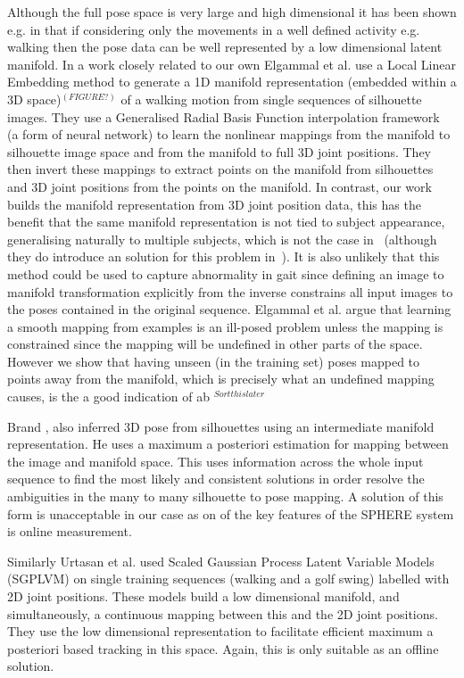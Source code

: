 \documentclass[11pt]{article} %
\begin{document}
Although the full pose space is very large and high dimensional it has been shown e.g. in \cite{Brand1999,Elgammal2004} that if considering only the movements in a well defined activity e.g. walking then the pose data can be well represented by a low dimensional latent manifold.  In a work closely related to our own Elgammal et al. \cite{Elgammal2004} use a Local Linear Embedding method to generate a 1D manifold representation (embedded within a 3D space)$^{(FIGURE?)}$ of a walking motion from single sequences of silhouette images. They use a Generalised Radial Basis Function interpolation framework~\cite{Poggio1990} (a form of neural network) to learn the nonlinear mappings from the manifold to silhouette image space and from the manifold to full 3D joint positions. They then invert these mappings to extract points on the manifold from silhouettes and 3D joint positions from the points on the manifold. In contrast, our work builds the manifold representation from 3D joint position data, this has the benefit that the same manifold representation is not tied to subject appearance, generalising naturally to multiple subjects, which is not the case in~\cite{Elgammal2004} (although they do introduce an solution for this problem in~\cite{Elgammal2004b}). It is also unlikely that this method could be used to capture abnormality in gait since defining an image to manifold transformation explicitly from the inverse constrains all input images to the poses contained in the original sequence.  Elgammal et al. argue that learning a smooth mapping from examples is an ill-posed problem unless the mapping is constrained since the mapping will be undefined in other parts of the space. However we show that having unseen (in the training set) poses mapped to points away from the manifold, which is precisely what an undefined mapping causes, is the a good indication of ab $^{Sort this later}$

Brand \cite{Brand1999}, also inferred 3D pose from silhouettes using an intermediate manifold representation. He uses a maximum a posteriori estimation for mapping between the image and manifold space. This uses information across the whole input sequence to find the most likely  and consistent solutions in order resolve the ambiguities in the many to many silhouette to pose mapping. A solution of this form is unacceptable in our case as on of the key features of the SPHERE system is online measurement.

Similarly Urtasan et al. \cite{Urtasun2005} used Scaled Gaussian Process Latent Variable Models (SGPLVM) \cite{Lawrence2004} on single training sequences (walking and a golf swing) labelled with 2D joint positions. These models build a low dimensional manifold, and simultaneously, a continuous mapping between this and the 2D joint positions. They use the low dimensional representation to facilitate efficient maximum a posteriori based tracking in this space. Again, this is only suitable as an offline solution. 
\end{document}
